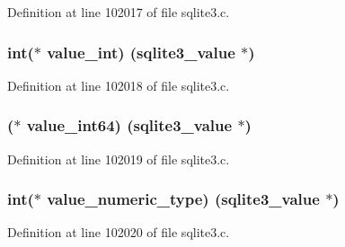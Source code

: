 Definition at line 102017 of file sqlite3.\+c.

\hypertarget{structsqlite3__api__routines_a8c05f2a220e674c0c5a053ad703dd059}{}
\subsubsection[{value\+\_\+int}]{\setlength{\rightskip}{0pt plus 5cm}int($\ast$ value\+\_\+int) (sqlite3\+\_\+value $\ast$)}\label{structsqlite3__api__routines_a8c05f2a220e674c0c5a053ad703dd059}


Definition at line 102018 of file sqlite3.\+c.

\hypertarget{structsqlite3__api__routines_a92d79e3dc71cf16389ff7b99c3cc1480}{}
\subsubsection[{value\+\_\+int64}]{($\ast$ value\+\_\+int64) (sqlite3\+\_\+value $\ast$)}\label{structsqlite3__api__routines_a92d79e3dc71cf16389ff7b99c3cc1480}


Definition at line 102019 of file sqlite3.\+c.

\hypertarget{structsqlite3__api__routines_ab425fadd72ab82f1f7177950311d3da4}{}
\subsubsection[{value\+\_\+numeric\+\_\+type}]{\setlength{\rightskip}{0pt plus 5cm}int($\ast$ value\+\_\+numeric\+\_\+type) (sqlite3\+\_\+value $\ast$)}\label{structsqlite3__api__routines_ab425fadd72ab82f1f7177950311d3da4}


Definition at line 102020 of file sqlite3.\+c.

\hypertarget{structsqlite3__api__routines_a5e6ca1b3e3e55d39699bad63c21138a3}{}
